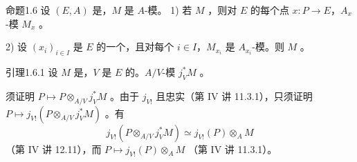 \begin{SGAresult}{命题}{1.6}
设 $(E,A)$ 是，$M$ 是 $A$-模。
1) 若 $M$ ，则对 $E$ 的每个点 $x:P\to E$，$A_x$-模 $M_x$ 。

2) 设 $(x_i)_{i\in I}$ 是 $E$ 的一个，且对每个 $i\in I$，$M_{x_i}$ 是 $A_{x_i}$-模。则 $M$ 。
\end{SGAresult}
\begin{SGAresult}{引理}{1.6.1}
设 $M$ 是，$V$ 是 $E$ 的。$A/V$-模 $j_V^*M$ 。
\end{SGAresult}
须证明 $P\mapsto P\otimes_{A/V}j_V^*M$ 。由于 $j_{V!}$ 且忠实（第 IV 讲 11.3.1），只须证明 $P\mapsto j_{V!}(P\otimes_{A/V}j_V^*M)$ 。有
\[
 j_{V!}(P\otimes_{A/V}j_V^*M)\simeq j_{V!}(P)\otimes_AM
\]
（第 IV 讲 12.11），而 $P\mapsto j_{V!}(P)\otimes_AM$ （第 IV 讲 11.3.1）。

